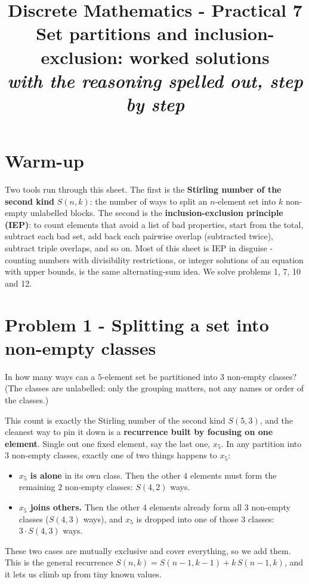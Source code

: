 \documentclass[11pt,a4paper]{article}
\title{\vspace{-1.2cm}\textbf{Discrete Mathematics - Practical 7}\\[2pt]
\large Set partitions and inclusion-exclusion: worked solutions\\[2pt]
\normalsize\itshape with the reasoning spelled out, step by step}
\author{}
\date{}
\begin{document}
\maketitle
\vspace{-1.0cm}

\section*{Warm-up}
Two tools run through this sheet. The first is the \textbf{Stirling number of the second kind}
$S(n,k)$: the number of ways to split an $n$-element set into $k$ non-empty unlabelled blocks. The
second is the \textbf{inclusion-exclusion principle (IEP)}: to count elements that avoid a list of
\textquotedbl{}bad\textquotedbl{} properties, start from the total, subtract each bad set, add back
each pairwise overlap (subtracted twice), subtract triple overlaps, and so on. Most of this sheet is
IEP in disguise - counting numbers with divisibility restrictions, or integer solutions of an
equation with upper bounds, is the same alternating-sum idea. We solve problems 1, 7, 10 and 12.

\section*{Problem 1 - Splitting a set into non-empty classes}

\begin{problembox}[1]
In how many ways can a $5$-element set be partitioned into $3$ non-empty classes? (The classes are
unlabelled: only the grouping matters, not any names or order of the classes.)
\end{problembox}

\begin{ideabox}
This count is exactly the Stirling number of the second kind $S(5,3)$, and the cleanest way to pin
it down is a \textbf{recurrence built by focusing on one element}. Single out one fixed element, say
the last one, $x_5$. In any partition into $3$ non-empty classes, exactly one of two things happens
to $x_5$:
\begin{itemize}[nosep,leftmargin=2em]
  \item \textbf{$x_5$ is alone} in its own class. Then the other $4$ elements must form the
        remaining $2$ non-empty classes: $S(4,2)$ ways.
  \item \textbf{$x_5$ joins others.} Then the other $4$ elements already form all $3$ non-empty
        classes ($S(4,3)$ ways), and $x_5$ is dropped into one of those $3$ classes: $3\cdot
        S(4,3)$ ways.
\end{itemize}
These two cases are mutually exclusive and cover everything, so we add them. This is the general
recurrence $S(n,k)=S(n-1,k-1)+k\,S(n-1,k)$, and it lets us climb up from tiny known values.
\end{ideabox}
\end{document}
